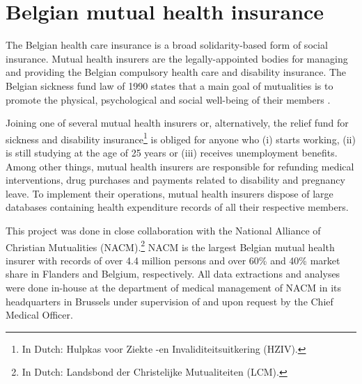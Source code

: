\section{Belgian mutual health insurance} \label{intro:health-insurance}
The Belgian health care insurance is a broad solidarity-based form of social insurance. Mutual health insurers are the legally-appointed bodies for managing and providing the Belgian compulsory health care and disability insurance. The Belgian sickness fund law of 1990 states that a main goal of mutualities is to promote the physical, psychological and social well-being of their members \citep{ziekenfondswet}.

Joining one of several mutual health insurers or, alternatively, the relief fund for sickness and disability insurance\footnote{In Dutch: Hulpkas voor Ziekte -en Invaliditeitsuitkering (HZIV).} is obliged for anyone who (i) starts working, (ii) is still studying at the age of 25 years or (iii) receives unemployment benefits. Among other things, mutual health insurers are responsible for refunding medical interventions, drug purchases and payments related to disability and pregnancy leave. To implement their operations, mutual health insurers dispose of large databases containing health expenditure records of all their respective members. 

This project was done in close collaboration with the National Alliance of Christian Mutualities (NACM).\footnote{In Dutch: Landsbond der Christelijke Mutualiteiten (LCM).} NACM  is the largest Belgian mutual health insurer with records of over 4.4 million persons and over 60\% and 40\% market share in Flanders and Belgium, respectively. All data extractions and analyses were done in-house at the department of medical management of NACM in its headquarters in Brussels under supervision of and upon request by the Chief Medical Officer.

